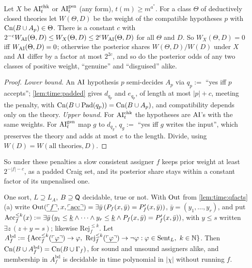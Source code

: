 \begin{proposition}\label{prop:time:disguised}
Let $X$ be $\mathrm{AI}^{\mathrm{chk}}_t$ or $\mathrm{AI}^{\mathrm{gen}}_t$ (any form), $t(m)\ge m^{a^*}$. For a class $\Theta$ of deductively closed theories let $W(\Theta,D)$ be the weight of the compatible hypotheses $p$ with $\mathrm{Cn}(B\cup A_p)\in\Theta$. There is a constant $c$ with $2^{-c}W_{\mathrm{AI}}(\Theta,D)\le W_X(\Theta,D)\le2^cW_{\mathrm{AI}}(\Theta,D)$ for all $\Theta$ and $D$. So $W_X(\Theta,D)=0$ iff $W_{\mathrm{AI}}(\Theta,D)=0$; otherwise the posterior shares $W(\Theta,D)/W(D)$ under $X$ and $\mathrm{AI}$ differ by a factor at most $2^{2c}$, and so do the posterior odds of any two classes of positive weight, ``genuine'' and ``disguised'' alike.
\end{proposition}

\begin{proof}
\emph{Lower bound.} An $\mathrm{AI}$ hypothesis $p$ semi-decides $A_p$ via $q_p:=$ ``yes iff $p$ accepts''; \cref{lem:time:padded} gives $d_{q_p}$ and $e_{q_p}$, of length at most $|p|+c$, meeting the penalty, with $\mathrm{Cn}(B\cup\mathrm{Pad}(q_p))=\mathrm{Cn}(B\cup A_p)$, and compatibility depends only on the theory. \emph{Upper bound.} For $\mathrm{AI}^{\mathrm{chk}}_t$ the hypotheses are $\mathrm{AI}$'s with the same weights. For $\mathrm{AI}^{\mathrm{gen}}_t$ map $g$ to $d_{q_g}$, $q_g:=$ ``yes iff $g$ writes the input'', which preserves the theory and adds at most $c$ to the length. Divide, using $W(D)=W(\text{all theories},D)$.
\end{proof}

\noindent So under these penalties a slow consistent assigner $f$ keeps prior weight at least $2^{-|f|-c}$, as a padded Craig set, and its posterior share stays within a constant factor of its unpenalised one.

\begin{proposition}\label{prop:time:bounded}
One sort, $L\supseteq L_A$, $B\supseteq\mathsf{Q}$ decidable, true or not. With $\mathrm{Out}$ from \cref{lem:time:qfacts}(a) write $\mathrm{Out}(\underline{\ulcorner f\urcorner},x,\underline{\ulcorner \mathrm{acc}\urcorner})=\exists\bar y\,(P_f(x,\bar y)=P'_f(x,\bar y))$, $\bar y=(y_1,\dots,y_r)$, and put $\mathrm{Acc}^{\le k}_f(x):=\exists\bar y\,(y_1\le\underline{k}\wedge\dots\wedge y_r\le\underline{k}\wedge P_f(x,\bar y)=P'_f(x,\bar y))$, with $y\le s$ written $\exists z\,(z+y=s)$; likewise $\mathrm{Rej}^{\le k}_f$. Let $A^{\mathrm{bd}}_f:=\{\mathrm{Acc}^{\le k}_f(\num{\gn\varphi})\to\varphi,\ \mathrm{Rej}^{\le k}_f(\num{\gn\varphi})\to\neg\varphi:\varphi\in\Sent_L,\ k\in\N\}$. Then $\mathrm{Cn}(B\cup A^{\mathrm{bd}}_f)=\mathrm{Cn}(B\cup\Gamma_f)$, for sound and unsound assigners alike, and membership in $A^{\mathrm{bd}}_f$ is decidable in time polynomial in $|\chi|$ without running $f$.
\end{proposition}

